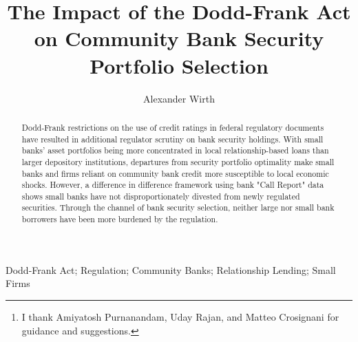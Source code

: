 \documentclass[preprint,12pt]{elsarticle}
\begin{document}
\begin{frontmatter}


\title{The Impact of the Dodd-Frank Act on Community Bank Security Portfolio Selection} 




\author{Alexander Wirth}

\address{Finance PhD Student, Ross School of Business \\ 
710 East University Executive Residence \\ 
Ann Arbor, MI 48109 \\ 
amwirth@umich.edu\footnote{I thank Amiyatosh Purnanandam, Uday Rajan, and Matteo Crosignani for guidance and suggestions.}}

\begin{abstract}
Dodd-Frank restrictions on the use of credit ratings in federal regulatory documents have resulted in additional regulator scrutiny on bank security holdings.  With small banks' asset portfolios being more concentrated in local relationship-based loans than larger depository institutions, departures from security portfolio optimality make small banks and firms reliant on community bank credit more susceptible to local economic shocks.  However, a difference in difference framework using bank "Call Report" data shows small banks have not disproportionately divested from newly regulated securities.  Through the channel of bank security selection, neither large nor small bank borrowers have been more burdened by the regulation.  
\end{abstract}

\begin{keyword}
Dodd-Frank Act; Regulation; Community Banks; Relationship Lending; Small Firms


\end{keyword}

\end{frontmatter}
\end{document}
